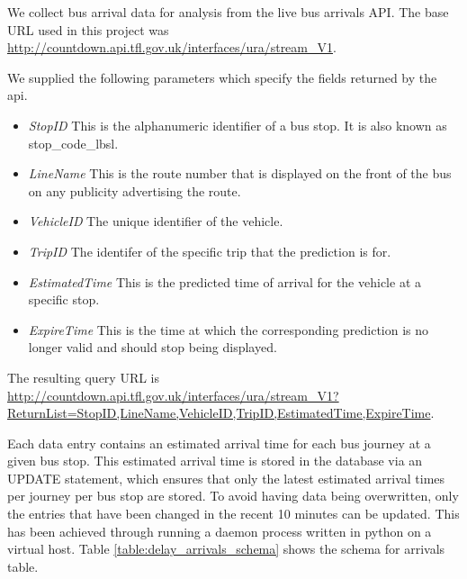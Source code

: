 \par We collect bus arrival data for analysis from the live bus arrivals API. The base URL used in this project was \url{http://countdown.api.tfl.gov.uk/interfaces/ura/stream_V1}.

\par We supplied the following parameters which specify the fields returned by the \acrshort{api}.

\begin{itemize}
  \item \textit{StopID} This is the alphanumeric identifier of a bus stop. It is also known as stop\_code\_lbsl.
  \item \textit{LineName} This is the route number that is displayed on the front of the bus on any publicity advertising the route.
  \item \textit{VehicleID} The unique identifier of the vehicle.
  \item \textit{TripID} The identifer of the specific trip that the prediction is for.
  \item \textit{EstimatedTime} This is the predicted time of arrival for the vehicle at a specific stop.
  \item \textit{ExpireTime} This is the time at which the corresponding prediction is no longer valid and should stop being displayed.
\end{itemize}

\par The resulting query URL is \sloppy \url{http://countdown.api.tfl.gov.uk/interfaces/ura/stream_V1?ReturnList=StopID,LineName,VehicleID,TripID,EstimatedTime,ExpireTime}.

\par Each data entry contains an estimated arrival time for each bus journey at a given bus stop. This estimated arrival time is stored in the database via an UPDATE statement, which ensures that only the latest estimated arrival times per journey per bus stop are stored. To avoid having data being overwritten, only the entries that have been changed in the recent 10 minutes can be updated. This has been achieved through running a daemon process written in python on a virtual host. Table \ref{table:delay_arrivals_schema} shows the schema for arrivals table.

